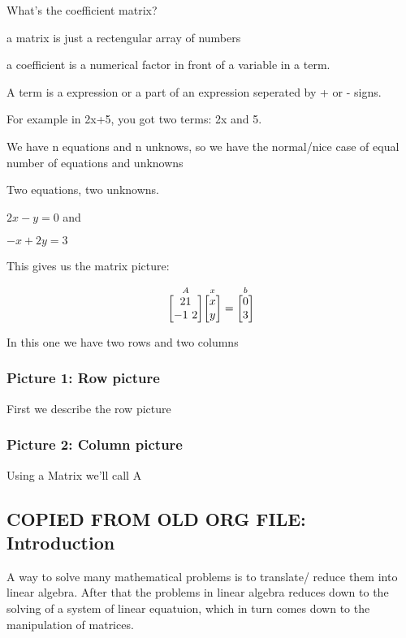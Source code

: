 \documentclass{article}
\begin{document}
What's the coefficient matrix?

a matrix is just a rectengular array of numbers

a coefficient is a numerical factor in front of a variable in a term.

A term is a expression or a part of an expression seperated by + or - signs.

For example in 2x+5, you got two terms: 2x and 5.

We have n equations and n unknows,
so we have the normal/nice case of equal number of equations and unknowns

Two equations, two unknowns.

$2x-y=0$
and

$-x+2y=3$

This gives us the matrix picture:

$$
\overset{A}{\begin{bmatrix}
 2 \- 1 \\ 
 -1\ 2
\end{bmatrix}}
\overset{x}{\begin{bmatrix}
x \\ y 
\end{bmatrix}}
= \overset{b}{\begin{bmatrix}
0 \\ 3
\end{bmatrix}}
$$





In this one we have two rows and two columns
\subsubsection*{Picture 1: Row picture}
First we describe the row picture

\subsubsection*{Picture 2: Column picture}
Using a Matrix we'll call A

\subsection{COPIED FROM OLD ORG FILE: Introduction}
A way to solve many mathematical problems is to translate/ reduce them into linear algebra.
After that the problems in linear algebra reduces down to the solving of a system of linear equatuion,
which in turn comes down to the manipulation of matrices.
\end{document}
